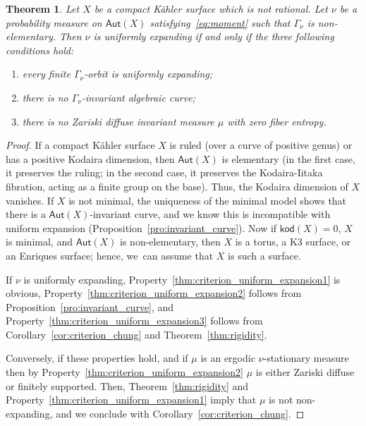 \documentclass[11pt]{article}
\newcommand\Aut{\mathsf{Aut}}
\theoremstyle{plain}
\newtheorem{thm}{Theorem}[section]
\theoremstyle{definition}
\numberwithin{equation}{section}
\begin{document}
\begin{thm}\label{thm:criterion_uniform_expansion}
Let $X$ be a compact Kähler surface which is not rational. Let $\nu$ be a probability measure on
$\Aut(X)$ satisfying~\eqref{eq:moment} such that $\Gamma_\nu$ is non-elementary.
Then $\nu$ is uniformly expanding if and only if the three following conditions
hold:
\begin{enumerate}
\item\label{thm:criterion_uniform_expansion1} every finite $\Gamma_\nu$-orbit is uniformly expanding;
\item\label{thm:criterion_uniform_expansion2} there is no $\Gamma_\nu$-invariant algebraic curve;
\item\label{thm:criterion_uniform_expansion3} there is no Zariski diffuse invariant measure $\mu$ with zero fiber entropy.
\end{enumerate}
\end{thm}

\begin{proof} If a compact Kähler surface $X$ is ruled (over a curve of positive genus) or has a positive Kodaira dimension, then $\Aut(X)$ is elementary (in the first case, it preserves the ruling; in the second case, it preserves the Kodaira-Iitaka fibration, acting as a finite group on the base). Thus, the Kodaira dimension of $X$ vanishes. If $X$ is not minimal, the uniqueness of the minimal model shows that there is a $\Aut(X)$-invariant curve, and we know this is incompatible with uniform expansion (Proposition~\ref{pro:invariant_curve}). Now if ${\mathsf{kod}}(X)=0$, $X$ is minimal, and $\Aut(X)$ is non-elementary, then $X$ is a torus, a K3 surface, or an Enriques surface; hence, we~can assume that $X$ is such a surface.

If $\nu$ is uniformly expanding, Property~\eqref{thm:criterion_uniform_expansion1} is obvious, Property~\eqref{thm:criterion_uniform_expansion2} follows from Proposition~\ref{pro:invariant_curve}, and
Property~\eqref{thm:criterion_uniform_expansion3} follows from Corollary~\ref{cor:criterion_chung} and Theorem~\ref{thm:rigidity}.

Conversely, if these properties hold, and if $\mu$ is an ergodic $\nu$-stationary measure then by Property~\eqref{thm:criterion_uniform_expansion2}
$\mu$ is either Zariski diffuse or finitely supported. Then, Theorem~\ref{thm:rigidity} and Property~\eqref{thm:criterion_uniform_expansion1} imply that $\mu$ is not non-expanding, and we conclude with Corollary~\ref{cor:criterion_chung}.
\end{proof}
\end{document}
